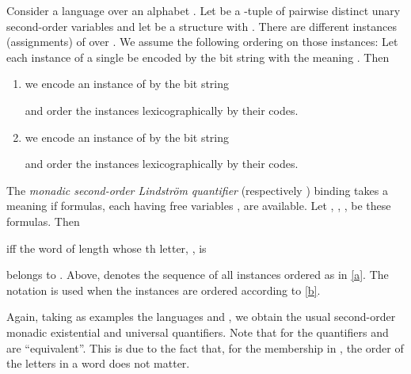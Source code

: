 \documentclass{LMCS}
\begin{document}
\begin{defi}\label{lind2}
Consider a language  over an alphabet . Let  be a -tuple of   pairwise distinct  unary
second-order variables and let   be a structure with .   There are 
different instances (assignments) of  over . We assume the following
ordering on those instances: Let each instance of a single  be
encoded by the bit string  with the meaning . Then
\begin{enumerate}[(1)]
\item\label{a} we encode an instance of  by the bit
string

and order the instances lexicographically by
their codes.
\item\label{b} we  encode an instance of  by the bit
string

 and order the instances lexicographically by
their codes.
\end{enumerate}
The \emph{monadic second-order Lindstr{\"o}m quantifier\/}  (respectively ) binding  takes
a meaning if  formulas, each having free variables , are
available.  Let , , ,
 be these  formulas.  Then 

 iff the
word of length  whose th letter, , is

belongs to . Above,  denotes the sequence
of all instances ordered as in \eqref{a}. The notation  is used when the instances are ordered according to  \eqref{b}.
\end{defi}
Again, taking as examples the languages  and
, we obtain the usual second-order monadic existential and
universal quantifiers. Note that for  the quantifiers 
and  are ``equivalent''. This is due to the fact that,  for the
membership in , the order of the letters in a word does not matter.
\end{document}
